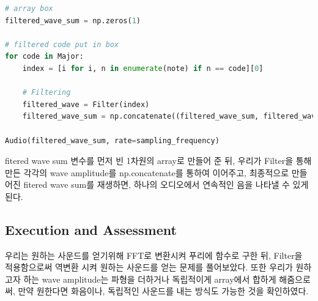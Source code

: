 \documentclass[11pt]{article}
\begin{document}
\begin{lstlisting}[language=Python]
# array box
filtered_wave_sum = np.zeros(1)

# filtered code put in box
for code in Major:
    index = [i for i, n in enumerate(note) if n == code][0]

    # Filtering 
    filtered_wave = Filter(index)
    filtered_wave_sum = np.concatenate((filtered_wave_sum, filtered_wave), axis = 0)

Audio(filtered_wave_sum, rate=sampling_frequency)
\end{lstlisting}
fitered wave sum 변수를 먼저 빈 1차원의 array로 만들어 준 뒤, 우리가 Filter을 통해 만든 각각의 wave amplitude를 np.concatenate를 통하여 이어주고, 최종적으로 만들어진 fitered wave sum를 재생하면, 하나의 오디오에서 연속적인 음을 나타낼 수 있게 된다. 

\subsection{Execution and Assessment}
우리는 원하는 사운드를 얻기위해 FFT로 변환시켜 푸리에 함수로 구한 뒤, Filter을 적용함으로써 역변환 시켜 원하는 사운드를 얻는 문제를 풀어보았다. 또한 우리가 원하고자 하는 wave amplitude는 파형을 더하거나 독립적이게 array에서 합하게 해줌으로써, 만약 원한다면 화음이나, 독립적인 사운드를 내는 방식도 가능한 것을 확인하였다.
\end{document}
